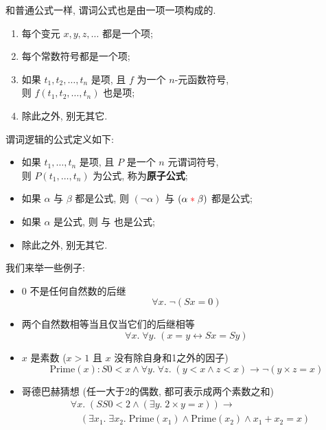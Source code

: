 和普通公式一样, 谓词公式也是由一项一项构成的.

\begin{definition}[项 (Term)]
  \begin{enumerate}
    \item 每个变元 $x, y, z, \dots$ 都是一个项;
    \item 每个常数符号都是一个项;
    \item 如果 $t_{1}, t_{2}, \dots, t_{n}$ 是项,
      且 $f$ 为一个 $n$-元函数符号, \\
      则 $f(t_{1}, t_{2}, \dots, t_{n})$ 也是项;
    \item 除此之外, 别无其它. 
  \end{enumerate}
\end{definition}

\begin{definition}[公式 (Formula)] 谓词逻辑的公式定义如下: 
  \begin{itemize}
    \item 如果 $t_{1}, \dots, t_{n}$ 是项, 且 $P$ 是一个 $n$ 元谓词符号, \\
      则 $P(t_{1}, \dots, t_{n})$ 为公式, 称为{\bf 原子公式};
    \item 如果 $\alpha$ 与 $\beta$ 都是公式, 则 $(\lnot \alpha)$
      与 $(\alpha \;\textcolor{red}{\ast}\; \beta)$ 都是公式;
    \item 如果 $\alpha$ 是公式, 则 
      与  也是公式;
    \item 除此之外, 别无其它. 
  \end{itemize}
\end{definition}

我们来举一些例子: 

\begin{example}
	\begin{itemize}
    \item 0 不是任何自然数的后继
        \[
          \forall x.\; \lnot (Sx = 0)
        \]
      \item 两个自然数相等当且仅当它们的后继相等
        \[
          \forall x.\; \forall y.\; (x = y \leftrightarrow Sx = Sy)
        \]
      \item $x$ 是素数 ($x > 1$ 且 $x$ 没有除自身和1之外的因子)
        \[
          \text{Prime}(x): S0 < x \land \forall y.\; \forall z.\; (y < x \land z < x) \to \lnot (y \times z = x)
        \]
      \item 哥德巴赫猜想 (任一大于2的偶数, 都可表示成两个素数之和)
        \begin{align*}
          &\forall x.\; (SS0 < 2 \land (\exists y.\; 2 \times y = x)) \to \\
            &\quad (\exists x_{1}.\; \exists x_{2}.\; \text{Prime}(x_{1}) \land \text{Prime}(x_{2})
              \land x_{1} + x_{2} = x)
        \end{align*}
  \end{itemize}

\end{example}

